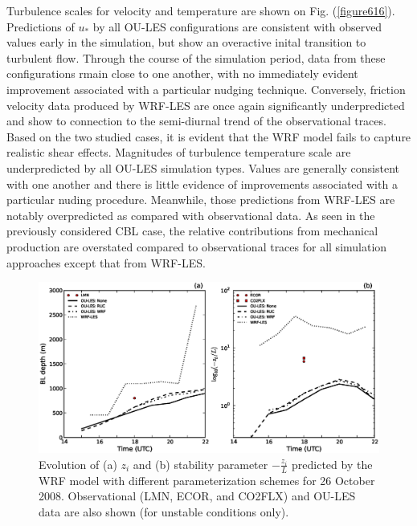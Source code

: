 Turbulence scales for velocity and temperature are shown on Fig. (\autoref{figure616}). Predictions of $u_*$ by all OU-LES configurations are consistent with observed values early in the simulation, but show an overactive inital transition to turbulent flow. Through the course of the simulation period, data from these configurations rmain close to one another, with no immediately evident improvement associated with a particular nudging technique. Conversely, friction velocity data produced by WRF-LES are once again significantly underpredicted and show to connection to the semi-diurnal trend of the observational traces. Based on the two studied cases, it is evident that the WRF model fails to capture realistic shear effects. Magnitudes of turbulence temperature scale are underpredicted by all OU-LES simulation types. Values are generally consistent with one another and there is little evidence of improvements associated with a particular nuding procedure. Meanwhile, those predictions from WRF-LES are notably overpredicted as compared with observational data. As seen in the previously considered CBL case, the relative contributions from mechanical production are overstated compared to observational traces for all simulation approaches except that from WRF-LES. 


\begin{figure}[H]
\begin{center}
\includegraphics[width=\textwidth]{figures/chapter6/pblh_phi_20081026}
\end{center}
\caption{Evolution of (a) $z_i$ and (b) stability parameter $-\frac{z_i}{L}$ predicted by the WRF model with different parameterization schemes for 26 October 2008. Observational (LMN, ECOR, and CO2FLX) and OU-LES data are also shown (for unstable conditions only).}
\label{figure617}
\end{figure}


